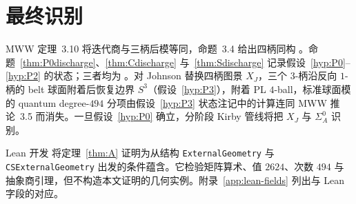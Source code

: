 \section{最终识别}\label{sec:final-identifications}

MWW 定理~3.10 将迭代商与三柄后模等同，命题~3.4 给出四柄同构 \cite{ManolescuWalkerWedrich2023}。命题~\ref{thm:P0discharge}、\ref{thm:Cdischarge} 与~\ref{thm:Sdischarge} 记录假设~\ref{hyp:P0}--\ref{hyp:P2} 的状态；三者均为 \Open。对 Johnson 替换四柄图景 $X_J$，三个 $3$-柄沿反向 $1$-柄的 belt 球面附着后恢复边界 $S^3$（假设~\ref{hyp:P3}），附着 PL $4$-ball，标准球面模的 quantum degree-$494$ 分项由假设~\ref{hyp:P3} 状态注记中的计算连同 MWW 推论~3.5 而消失。一旦假设~\ref{hyp:P0} 确立，分阶段 Kirby 管线将把 $X_J$ 与 $\Sigma_A^0$ 识别。

\begin{remark}[形式化边界]\label{rem:lean-boundary}
Lean 开发 \cite{Lean4} 将定理~\ref{thm:A} 证明为从结构 \texttt{ExternalGeometry} 与 \texttt{CSExternalGeometry} 出发的条件蕴含。它检验矩阵算术、值 $2624$、次数 $494$ 与抽象商引理，但不构造本文证明的几何实例。附录~\ref{app:lean-fields} 列出与 Lean 字段的对应。
\end{remark}
